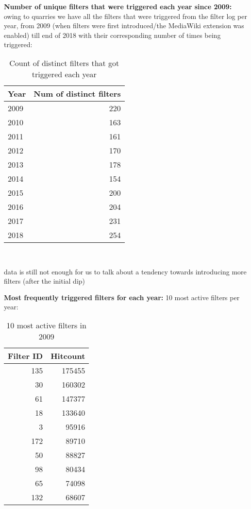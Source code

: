 \documentclass{sigchi}
\begin{document}
\textbf{Number of unique filters that were triggered each year since 2009:}
owing to quarries we have all the filters that were triggered from the filter log per year, from 2009 (when filters were first introduced/the MediaWiki extension was enabled) till end of 2018 with their corresponding number of times being triggered:
\begin{table}
  \centering
  \begin{tabular}{l r }
    Year & Num of distinct filters \\
    \hline
    2009 & 220 \\
    2010 & 163 \\
    2011 & 161 \\
    2012 & 170 \\
    2013 & 178 \\
    2014 & 154 \\
    2015 & 200 \\
    2016 & 204 \\
    2017 & 231 \\
    2018 & 254 \\
  \end{tabular}
  \caption{Count of distinct filters that got triggered each year}~\label{tab:active-filters-count}
\end{table}

data is still not enough for us to talk about a tendency towards introducing more filters (after the initial dip)


\textbf{Most frequently triggered filters for each year:}
10 most active filters per year:
\begin{table}
  \centering
  \begin{tabular}{r r }
    Filter ID & Hitcount \\
    \hline
    135 & 175455 \\
    30 & 160302 \\
    61 & 147377 \\
    18 & 133640 \\
    3 & 95916 \\
    172 & 89710 \\
    50 & 88827 \\
    98 & 80434 \\
    65 & 74098 \\
    132 & 68607 \\
  \end{tabular}
  \caption{10 most active filters in 2009}~\label{tab:most-active-2009}
\end{table}
\end{document}
